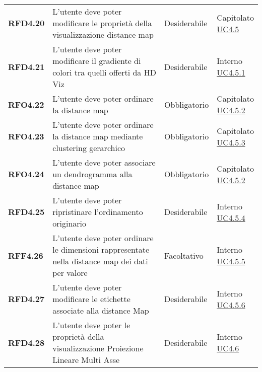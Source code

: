 \begin{longtable}[H]{>{\raggedright\bfseries}m{20mm} >{\raggedright}m{90mm} >{\raggedright}m{28mm} >{\raggedright\arraybackslash}m{30mm}}
    RFD4.20
    & L'utente deve poter modificare le proprietà della visualizzazione distance map
    & Desiderabile
    & \makecell{ Capitolato \\ \hyperref[ssub:uc4.5]{UC4.5} }\\

    RFD4.21
    & L'utente deve poter modificare il gradiente di colori tra quelli offerti da HD Viz
    & Desiderabile
    & \makecell{ Interno \\ \hyperref[par:uc4.5.1]{UC4.5.1} }\\

    RFO4.22
    & L'utente deve poter ordinare la distance map
    & Obbligatorio
    & \makecell{ Capitolato \\ \hyperref[par:uc4.5.2]{UC4.5.2} }\\

    RFO4.23
    & L'utente deve poter ordinare la distance map mediante clustering gerarchico
    & Obbligatorio
    & \makecell{ Capitolato \\ \hyperref[par:uc4.5.3]{UC4.5.3} }\\

    RFO4.24
    & L'utente deve poter associare un dendrogramma alla distance map
    & Obbligatorio
    & \makecell{ Capitolato \\ \hyperref[par:uc4.5.2]{UC4.5.2} }\\

    RFD4.25
    & L'utente deve poter ripristinare l'ordinamento originario
    & Desiderabile
    & \makecell{ Interno \\ \hyperref[par:uc4.5.4]{UC4.5.4} }\\

    RFF4.26
    & L'utente deve poter ordinare le dimensioni rappresentate nella distance map dei dati per valore
    & Facoltativo
    & \makecell{ Interno \\ \hyperref[par:uc4.5.5]{UC4.5.5} }\\

    RFD4.27
    & L'utente deve poter modificare le etichette associate alla distance Map
    & Desiderabile
    & \makecell{ Interno \\ \hyperref[par:uc4.5.6]{UC4.5.6} }\\

    RFD4.28
    & L'utente deve poter le proprietà della visualizzazione Proiezione Lineare Multi Asse
    & Desiderabile
    & \makecell{ Interno \\  \hyperref[par:uc4.6.1]{UC4.6} }\\


\end{longtable}
